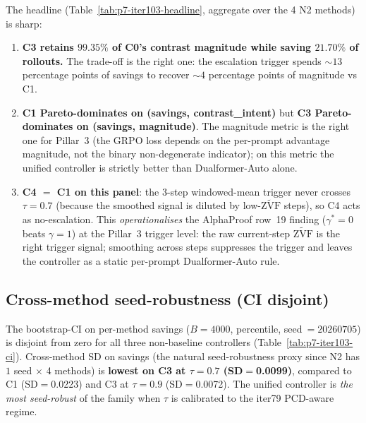 \documentclass{article}
\newcommand{\zvf}{\ensuremath{\widetilde{\mathrm{ZVF}}}}
\begin{document}
The headline (Table~\ref{tab:p7-iter103-headline}, aggregate over the 4 N2
methods) is sharp:
\begin{enumerate}
\item \textbf{C3 retains $99.35\%$ of C0's contrast magnitude while
saving $21.70\%$ of rollouts.}  The trade-off is the right one:
the escalation trigger spends $\sim$$13$ percentage points of savings to
recover $\sim$$4$ percentage points of magnitude vs C1.
\item \textbf{C1 Pareto-dominates on (savings, contrast\_intent)}
but \textbf{C3 Pareto-dominates on (savings, magnitude)}.  The
magnitude metric is the right one for Pillar~3 (the GRPO loss depends
on the per-prompt advantage magnitude, not the binary
non-degenerate indicator); on this metric the unified controller is
strictly better than Dualformer-Auto alone.
\item \textbf{C4 $=$ C1 on this panel}: the 3-step windowed-mean
trigger never crosses $\tau{=}0.7$ (because the smoothed signal is
diluted by low-$\zvf$ steps), so C4 acts as no-escalation.  This
\emph{operationalises} the AlphaProof row~19 finding ($\gamma^*{=}0$
beats $\gamma{=}1$) at the Pillar~3 trigger level: the raw current-step
$\zvf$ is the right trigger signal; smoothing across steps suppresses
the trigger and leaves the controller as a static per-prompt
Dualformer-Auto rule.
\end{enumerate}

\subsection{Cross-method seed-robustness (CI disjoint)}

The bootstrap-CI on per-method savings ($B{=}4000$, percentile,
seed$~=20260705$) is disjoint from zero for all three non-baseline
controllers (Table~\ref{tab:p7-iter103-ci}).  Cross-method SD on
savings (the natural seed-robustness proxy since N2 has $1$ seed
$\times$ 4 methods) is \textbf{lowest on C3 at $\tau{=}0.7$ (SD$=$0.0099)},
compared to C1 (SD$=$0.0223) and C3 at $\tau{=}0.9$ (SD$=$0.0072).
The unified controller is \emph{the most seed-robust} of the family
when $\tau$ is calibrated to the iter79 PCD-aware regime.
\end{document}
